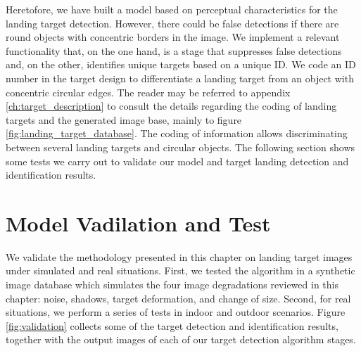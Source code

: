 Heretofore, we have built a model based on perceptual characteristics for the landing target detection. However, there could be false detections if there are round objects with concentric borders in the image. We implement a relevant functionality that, on the one hand, is a stage that suppresses false detections and, on the other, identifies unique targets based on a unique ID. We code an ID number in the target design to differentiate a landing target from an object with concentric circular edges. The reader may be referred to appendix \ref{ch:target_description} to consult the details regarding the coding of landing targets and the generated image base, mainly to figure \ref{fig:landing_target_database}. The coding of information allows discriminating between several landing targets and circular objects. The following section shows some tests we carry out to validate our model and target landing detection and identification results. 

\section{Model Vadilation and Test}\label{sec:validation_and_test}
We validate the methodology presented in this chapter on landing target images under simulated and real situations. First, we tested the algorithm in a synthetic image database which simulates the four image degradations reviewed in this chapter: noise, shadows, target deformation, and change of size. Second, for real situations, we perform a series of tests in indoor and outdoor scenarios. Figure \ref{fig:validation} collects some of the target detection and identification results, together with the output images of each of our target detection algorithm stages. 

